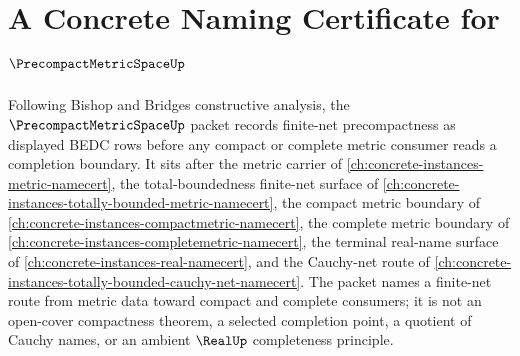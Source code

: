 \chapter{A Concrete Naming Certificate for $\PrecompactMetricSpaceUp$}
\label{ch:concrete-instances-precompact-metric-space-namecert}

Following Bishop and Bridges constructive analysis, the $\PrecompactMetricSpaceUp$ packet records finite-net precompactness as displayed BEDC rows before any compact or complete metric consumer reads a completion boundary. It sits after the metric carrier of \autoref{ch:concrete-instances-metric-namecert}, the total-boundedness finite-net surface of \autoref{ch:concrete-instances-totally-bounded-metric-namecert}, the compact metric boundary of \autoref{ch:concrete-instances-compactmetric-namecert}, the complete metric boundary of \autoref{ch:concrete-instances-completemetric-namecert}, the terminal real-name surface of \autoref{ch:concrete-instances-real-namecert}, and the Cauchy-net route of \autoref{ch:concrete-instances-totally-bounded-cauchy-net-namecert}. The packet names a finite-net route from metric data toward compact and complete consumers; it is not an open-cover compactness theorem, a selected completion point, a quotient of Cauchy names, or an ambient $\RealUp$ completeness principle.

